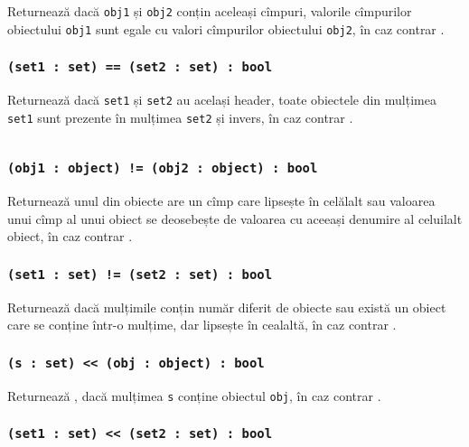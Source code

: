 Returnează \true{} dacă \texttt{obj1} și \texttt{obj2} conțin aceleași cîmpuri, valorile cîmpurilor obiectului \texttt{obj1} sunt egale cu valori cîmpurilor obiectului \texttt{obj2}, în caz contrar \false{}.

\subsubsection{\texttt{(set1 : set) == (set2 : set) : bool}}

Returnează \true{} dacă \texttt{set1} și \texttt{set2} au același header, toate obiectele din mulțimea \texttt{set1} sunt prezente în mulțimea \texttt{set2} și invers, în caz contrar \false{}.

\begin{sourcecode}
\label{setobjopex}
\inputminted[linenos]{icl}{../sources/setobjopex.icL}
\end{sourcecode}

\subsubsection{\texttt{(obj1 : object) != (obj2 : object) : bool}}

Returnează \true{} unul din obiecte are un cîmp care lipsește în celălalt sau valoarea unui cîmp al unui obiect se deosebește de valoarea cu aceeași denumire al celuilalt obiect, în caz contrar \false{}.

\subsubsection{\texttt{(set1 : set) != (set2 : set) : bool}}

Returnează \true{} dacă mulțimile conțin număr diferit de obiecte sau există un obiect care se conține într-o mulțime, dar lipsește în cealaltă, în caz contrar \false{}.

\subsubsection{\texttt{(s : set) << (obj : object) : bool}}

Returnează \true{}, dacă mulțimea \texttt{s} conține obiectul \texttt{obj}, în caz contrar \false{}.

\subsubsection{\texttt{(set1 : set) << (set2 : set) : bool}}

